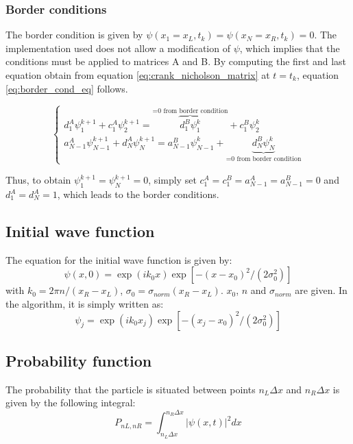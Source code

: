 \documentclass[a4paper,12pt,twoside]{article}
\begin{document}
    \subsubsection{Border conditions}
      The border condition is given by $\psi(x_1 = x_L, t_k) = \psi(x_N = x_R, t_k) = 0$.
      The implementation used does not allow a modification of $\psi$, which implies that the conditions must be applied to matrices A and B.
      By computing the first and last equation obtain from equation \eqref{eq:crank_nicholson_matrix} at $t=t_k$, equation \eqref{eq:border_cond_eq} follows.

      \begin{equation}
        \begin{cases}
          d_1^A\psi_1^{k+1} +c_1^A\psi_2^{k+1} = \overbrace{d_1^B\psi_1^k}^\text{=0 from border condition} + c_1^B\psi_2^k\\
          a_{N-1}^A\psi_{N-1}^{k+1} + d_N^A\psi_N^{k+1} = a_{N-1}^B\psi_{N-1}^k + \underbrace{d_N^B\psi_N^k}_\text{=0 from border condition}
        \end{cases}
        \label{eq:border_cond_eq}
      \end{equation}

      Thus, to obtain $\psi_1^{k+1} = \psi_N^{k+1} = 0$, simply set $c_1^A = c_1^B = a_{N-1}^A = a_{N-1}^B = 0$ and $d_1^A = d_N^A = 1$, which leads to the border conditions.

  \subsection{Initial wave function}
    The equation for the initial wave function is given by:
    \begin{equation}
     \psi(x,0)=\exp(ik_0x)\exp\left[-(x-x_0)^2/(2\sigma_0^2)\right]
     \label{eq:psiinit}
    \end{equation}
    with $k_0=2\pi n/(x_R-x_L)$, $\sigma_0=\sigma_{norm}(x_R-x_L)$. $x_0$, $n$ and $\sigma_{norm}$ are given. In the algorithm, it is simply written as:
    \begin{equation}
     \psi_j=\exp(ik_0x_j)\exp\left[-(x_j-x_0)^2/(2\sigma_0^2)\right]
     \label{eq:psiinitdis}
    \end{equation}

  \subsection{Probability function}
    The probability that the particle is situated between points $n_L\Delta x$ and $n_R\Delta x$ is given by the following integral:
    \begin{equation}
     P_{nL,nR} = \int_{n_L\Delta x}^{n_R\Delta x} |\psi(x,t)|^2 dx
    \end{equation}
\end{document}
